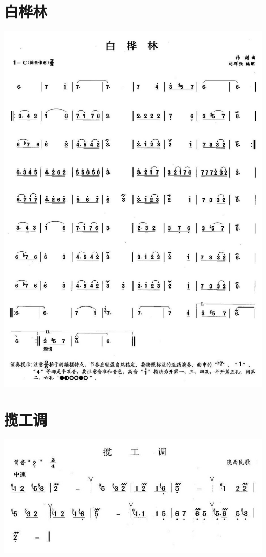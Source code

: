 \documentclass[cn,pad,chinese,chinesefont=nofont]{elegantbook}
\begin{document}
\section{白桦林}
    \includegraphics[width=\textwidth]{dongxiao/20200323白桦林.jpg}
\section{揽工调}
    \includegraphics[width=\textwidth]{dongxiao/20200323揽工调.jpg}
    
\end{document}
